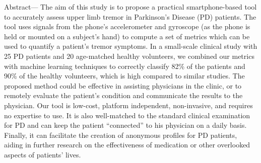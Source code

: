 Abstract— The aim of this study is to propose a practical smartphone-based tool to accurately assess upper limb tremor in Parkinson’s Disease (PD) patients. The tool uses signals from the phone’s accelerometer and gyroscope (as the phone is held or mounted on a subject’s hand) to compute a set of metrics which can be used to quantify a patient’s tremor symptoms. In a small-scale clinical study with 25 PD patients and 20 age-matched healthy volunteers, we combined our metrics with machine learning techniques to correctly classify 82\% of the patients and 90\% of the healthy volunteers, which is high compared to similar studies. The proposed method could be effective in assisting physicians in the clinic, or to remotely evaluate the patient’s condition and communicate the results to the physician. Our tool is low-cost, platform independent, non-invasive, and requires no expertise to use. It is also well-matched to the standard clinical examination for PD and can keep the patient “connected” to his physician on a daily basis. Finally, it can facilitate the creation of anonymous profiles for PD patients, aiding in further research on the effectiveness of medication or other overlooked aspects of patients’ lives. 

